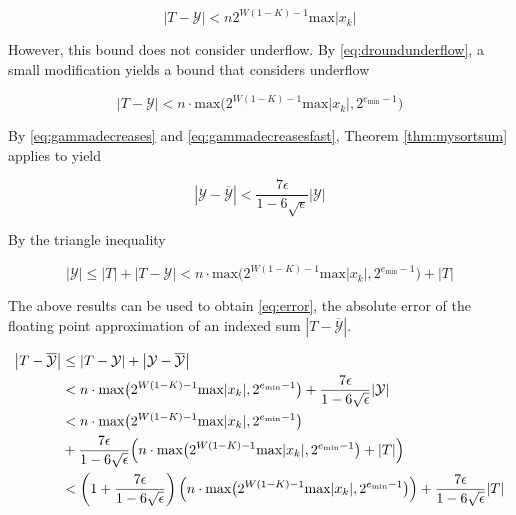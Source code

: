 \documentclass[12pt]{article}
\providecommand{\min}{\ensuremath{\text{min}}}
\providecommand{\max}{\ensuremath{\text{max}}}
\theoremstyle{definition}
\numberwithin{equation}{section}
\numberwithin{figure}{section}
\begin{document}
    \begin{equation}
      \label{eq:repboundnaive}
      |T - \mathcal{Y}| < n  2^{W  (1 - K) - 1}\max|x_k|
    \end{equation}

    However, this bound does not consider underflow. By  \eqref{eq:droundunderflow}, a small modification yields a bound that considers underflow

    \begin{equation}
      \label{eq:repbound}
      |T - \mathcal{Y}| < n \cdot \max\bigl(2^{W  (1 - K) - 1} \max|x_k|, 2^{e_{\min} - 1}\bigr)
    \end{equation}

    By  \eqref{eq:gammadecreases} and \eqref{eq:gammadecreasesfast}, Theorem \ref{thm:mysortsum} applies to yield

    \begin{equation*}
      \left|\mathcal{Y} - \overline{\mathcal{Y}}\right| < \frac{7\epsilon}{1 - 6\sqrt\epsilon}|\mathcal{Y}|
    \end{equation*}

    By the triangle inequality

    \begin{equation*}
      |\mathcal{Y}| \leq |T| + |T - \mathcal{Y}| < n \cdot \max\bigl(2^{W  (1 - K) - 1}  \max|x_k|, 2^{e_{\min} - 1}\bigr) + |T|
    \end{equation*}

    The above results can be used to obtain  \eqref{eq:error}, the absolute error of the floating point approximation of an indexed sum $|T - \overline{\mathcal{Y}}|$.

    \begin{align}
      \left|T - \overline{\mathcal{Y}}\right| &\leq |T - \mathcal{Y}| + \left|\mathcal{Y} - \overline{\mathcal{Y}}\right| \nonumber \\
      &< n \cdot \max\bigl(2^{W  (1 - K) - 1}  \max|x_k|, 2^{e_{\min} - 1}\bigr) + \frac{7\epsilon}{1 - 6\sqrt\epsilon} |\mathcal{Y}| \nonumber \\
      &< n \cdot \max\bigl(2^{W  (1 - K) - 1}  \max|x_k|, 2^{e_{\min} - 1}\bigr) \nonumber \\
      &+ \frac{7\epsilon}{1 - 6\sqrt\epsilon} \Bigl(n \cdot \max\bigl(2^{W  (1 - K) - 1}  \max|x_k|, 2^{e_{\min} - 1}\bigr) + |T|\Bigr) \nonumber \\
      &< \left(1 + \frac{7\epsilon}{1 - 6\sqrt\epsilon}\right) \Bigl(n \cdot \max\bigl(2^{W (1 - K) - 1} \max|x_k|, 2^{e_{\min} - 1}\bigr)\Bigr) + \frac{7\epsilon}{1 - 6\sqrt\epsilon} |T|
      \label{eq:error}
    \end{align}
\end{document}
